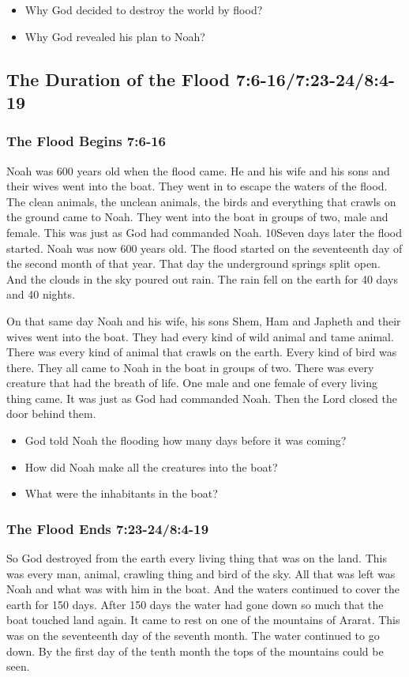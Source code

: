 \begin{itemize}
\item Why God decided to destroy the world by flood?
\item Why God revealed his plan to Noah? 
\end{itemize}





\subsection{The Duration of the Flood 7:6-16/7:23-24/8:4-19}
\subsubsection{The Flood Begins 7:6-16}
Noah was 600 years old when the flood came. He and his wife and his sons and their wives went into the boat. They went in to escape the waters of the flood. The clean animals, the unclean animals, the birds and everything that crawls on the ground came to Noah. They went into the boat in groups of two, male and female. This was just as God had commanded Noah. 10Seven days later the flood started.
Noah was now 600 years old. The flood started on the seventeenth day of the second month of that year. That day the underground springs split open. And the clouds in the sky poured out rain. The rain fell on the earth for 40 days and 40 nights.

On that same day Noah and his wife, his sons Shem, Ham and Japheth and their wives went into the boat. They had every kind of wild animal and tame animal. There was every kind of animal that crawls on the earth. Every kind of bird was there. They all came to Noah in the boat in groups of two. There was every creature that had the breath of life. One male and one female of every living thing came. It was just as God had commanded Noah. Then the Lord closed the door behind them.

\begin{itemize}
\item God told Noah the flooding how many days before it was coming?
\item How did Noah make all the creatures into the boat?
\item What were the inhabitants in the boat? 
\end{itemize}

\subsubsection{The Flood Ends 7:23-24/8:4-19}
So God destroyed from the earth every living thing that was on the land. This was every man, animal, crawling thing and bird of the sky. All that was left was Noah and what was with him in the boat. And the waters continued to cover the earth for 150 days. After 150 days the water had gone down so much that the boat touched land again. It came to rest on one of the mountains of Ararat. This was on the seventeenth day of the seventh month. The water continued to go down. By the first day of the tenth month the tops of the mountains could be seen.

